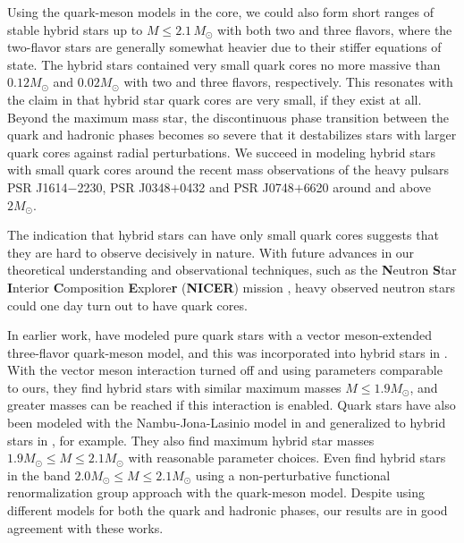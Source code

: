 Using the quark-meson models in the core, we could also form short ranges of stable hybrid stars up to $M \leq 2.1 \, M_\odot$
with both two and three flavors, where the two-flavor stars are generally somewhat heavier due to their stiffer equations of state.
The hybrid stars contained very small quark cores no more massive than $0.12 M_\odot$ and $0.02 M_\odot$ with two and three flavors, respectively.
This resonates with the claim in \cite{ref:quark_star_review} that hybrid star quark cores are very small, if they exist at all.
Beyond the maximum mass star,
the discontinuous phase transition between the quark and hadronic phases becomes so severe
that it destabilizes stars with larger quark cores against radial perturbations.
We succeed in modeling hybrid stars with small quark cores
around the recent mass observations \cite{ref:antoniadis,ref:arzoumanian,ref:fonseca}
of the heavy pulsars PSR J1614$-$2230, PSR J0348$+$0432 and PSR J0748$+$6620 around and above $2 M_\odot$.

The indication that hybrid stars can have only small quark cores
suggests that they are hard to observe decisively in nature.
With future advances in our theoretical understanding and observational techniques,
such as the \textbf{N}eutron \textbf{S}tar \textbf{I}nterior \textbf{C}omposition \textbf{E}xplore\textbf{r} (\textbf{NICER}) mission \cite{ref:nicer},
heavy observed neutron stars could one day turn out to have quark cores.


In earlier work, \cite{ref:lsm3f_compact_stars} have modeled pure quark stars with a vector meson-extended three-flavor quark-meson model,
and this was incorporated into hybrid stars in \cite{ref:lsm3f_hybrid_stars}.
With the vector meson interaction turned off and using parameters comparable to ours,
they find hybrid stars with similar maximum masses $M \leq 1.9 M_\odot$, %
and greater masses can be reached if this interaction is enabled.
Quark stars have also been modeled with the Nambu-Jona-Lasinio model in \cite{ref:quark_star_njl} and generalized to hybrid stars in \cite{ref:hybrid_stars_njl}, for example.
They also find maximum hybrid star masses $1.9 M_\odot \leq M \leq 2.1 M_\odot$ with reasonable parameter choices.
Even \cite{ref:quark_hybrid_additional_ref} find hybrid stars in the band $2.0 M_\odot \leq M \leq 2.1 M_\odot$
using a non-perturbative functional renormalization group approach with the quark-meson model.
Despite using different models for both the quark and hadronic phases,
our results are in good agreement with these works.

